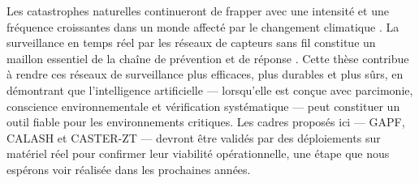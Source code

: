 Les catastrophes naturelles continueront de frapper avec une intensité et une fréquence croissantes dans un monde affecté par le changement climatique \cite{IPCC2021AR6}. La surveillance en temps réel par les réseaux de capteurs sans fil constitue un maillon essentiel de la chaîne de prévention et de réponse \cite{UNDRR2015Sendai}. Cette thèse contribue à rendre ces réseaux de surveillance plus efficaces, plus durables et plus sûrs, en démontrant que l'intelligence artificielle --- lorsqu'elle est conçue avec parcimonie, conscience environnementale et vérification systématique --- peut constituer un outil fiable pour les environnements critiques. Les cadres proposés ici --- GAPF, CALASH et CASTER-ZT --- devront être validés par des déploiements sur matériel réel pour confirmer leur viabilité opérationnelle, une étape que nous espérons voir réalisée dans les prochaines années.
